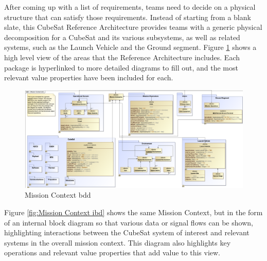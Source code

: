 After coming up with a list of requirements, teams need to decide on a physical structure that can satisfy those requirements. Instead of starting from a blank slate, this CubeSat Reference Architecture provides teams with a generic physical decomposition for a CubeSat and its various subsystems, as well as related systems, such as the Launch Vehicle and the Ground segment. Figure \ref{fig:Mission Context bdd} shows a high level view of the areas that the Reference Architecture includes. Each package is hyperlinked to more detailed diagrams to fill out, and the most relevant value properties have been included for each. 

\begin{figure}[H]
    \centering
    \includegraphics[scale=0.35, angle=90]{Thesis/Analysis_and_Results/Analysis and Results Figures/Mission Context bdd.png}
    \caption{Mission Context bdd}
    \label{fig:Mission Context bdd}
\end{figure}

Figure \ref{fig:Mission Context ibd} shows the same Mission Context, but in the form of an internal block diagram so that various data or signal flows can be shown, highlighting interactions between the CubeSat system of interest and relevant systems in the overall mission context. This diagram also highlights key operations and relevant value properties that add value to this view.

